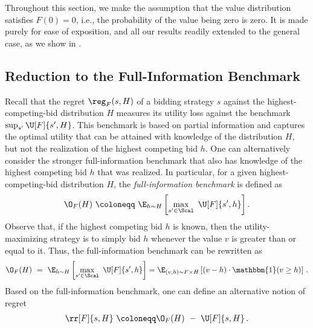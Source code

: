 Throughout this section, we make the assumption that the value distribution satisfies $F(0) = 0$, i.e., the probability of the value being zero is zero. It is made purely for ease of exposition, and all our results readily extended to the general case, as we show in .

\subsection{Reduction to the Full-Information Benchmark}\label{sec:full-info}

Recall that the regret $\reg_F(s,H)$ of a bidding strategy $s$ against the highest-competing-bid distribution $H$ measures its utility loss against the benchmark $\sup_{s'} \U[F]{s',H}$. This benchmark is based on partial information and captures the optimal utility that can be attained with knowledge of the distribution $H$, but not the realization of the highest competing bid $h$. One can alternatively consider the stronger full-information benchmark that also has knowledge of the highest competing bid $h$ that was realized. In particular, for a given highest-competing-bid distribution $H$, the \emph{full-information benchmark} is defined as
\begin{align*}
	\O_F(H)\ \coloneqq\ \E_{h \sim H}\left[ \max_{s' \in \Scal}\  \U[F]{s', h} \right].
\end{align*}
 Observe that, if the highest competing bid $h$ is known, then the utility-maximizing strategy is to simply bid $h$ whenever the value $v$ is greater than or equal to it. Thus, the full-information benchmark can be rewritten as
\begin{align*}
	\O_F(H)\ =\ \E_{h \sim H}\left[ \max_{s' \in \Scal}\  \U[F]{s',h} \right] = \E_{(v,h) \sim F \times H}\left[ (v-h) \cdot \mathbbm{1}(v \geq h) \right]\,.
\end{align*}
Based on the full-information benchmark, one can define an alternative notion of regret
\begin{align*}
	\rr[F]{s,H}\ \coloneqq \O_F(H)\ -\ \U[F]{s,H}\,. 
\end{align*}

